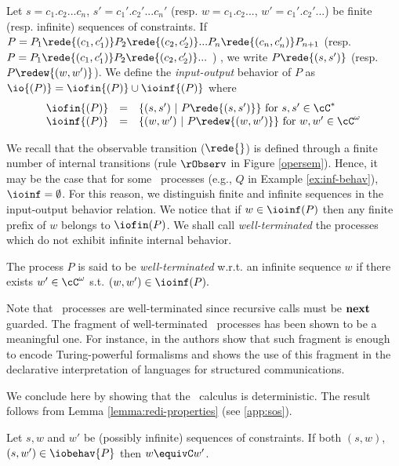 \documentclass{tlp}
\begin{document}
\begin{definition} \label{def:behavior}
Let $s=c_1.c_2...c_n$,  $s'=c_1'.c_2'...c_n'$ 
(resp. $w=c_1.c_2...$, $w'=c_1'.c_2'...$)
be finite (resp. infinite) sequences of
constraints. If   $P = P_1 \rede{(c_1,c_1')} P_2
\rede{(c_2,c_2')}...P_n\rede{(c_n,c_n')}P_{n+1}$
(resp. $P = P_1 \rede{(c_1,c_1')} P_2
\rede{(c_2,c_2')} ...$ )
, we  write $P\rede{(s,s')}$ (resp. $P\redew{(w,w')}$). We define the 
\emph{input-output} behavior of $P$ as $\io{(P)} = \iofin{(P)} \cup \ioinf{(P)}$ where
\[
\begin{array}{lll}
\iofin{(P)} &=& \{(s,s') \ | \ P \rede{(s,s')}\} \mbox{ for } s,s' \in \cC^{*}\\
\ioinf{(P)} &=& \{(w,w') \ | \ P \redew{(w,w')}\} \mbox{ for } w,w' \in \cC^{\omega}
\end{array}
\]
\end{definition}

We recall that  the observable transition ($\rede{}$) is defined through a finite number of internal transitions (rule $\rObserv$ in Figure \ref{opersem}). Hence,   it may be the case that for some \utcc\ processes (e.g., $Q$ in Example \ref{ex:inf-behav}), $\ioinf=\emptyset$.  For this reason, we distinguish finite and infinite sequences in the input-output behavior relation.  We notice that if $w\in \ioinf(P)$ then any finite prefix  of $w$ belongs to $\iofin(P)$.
 We shall call \emph{well-terminated}  the  processes which do not exhibit infinite internal behavior.

 \begin{definition}\label{def:wellterminated}
The process $P$ is said to be \emph{well-terminated} w.r.t. an infinite sequence $w$ if  there exists $w' \in \cC^\omega$ s.t.   $(w,w')\in \ioinf(P).$
\end{definition}

 Note that  \tccp\ processes are well-terminated since recursive calls must be ${\bf next}$ guarded. The fragment of well-terminated \utcc\ processes has been shown to be a meaningful one. For instance, in \cite{Olarte:08:PPDP} the authors show that such fragment is enough to  encode  Turing-powerful formalisms and  \cite{Lopez-Places09} shows the use of this fragment in the  declarative interpretation of languages for structured communications. 

We conclude here by showing that the \utcc\ calculus is deterministic. The result follows from Lemma \ref{lemma:redi-properties} (see  \ref{app:sos}).\begin{theorem}[Determinism] \label{theo:SOS-determinism}
Let $s,w$ and $w'$ be (possibly infinite) sequences of constraints. If both
$(s,w)$, $(s,w') \in \iobehav{P}$ then $w\equivC w'$. 
\end{theorem}
\end{document}
